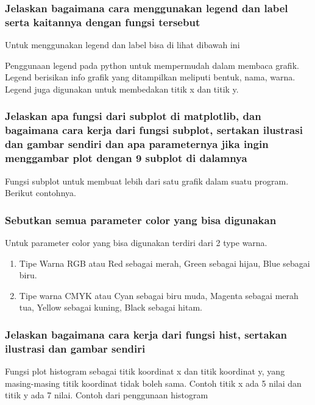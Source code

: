\subsubsection{Jelaskan bagaimana cara menggunakan legend dan label serta kaitannya dengan fungsi tersebut}
\hfill \break
Untuk menggunakan legend dan label bisa di lihat dibawah ini

Penggunaan legend pada python untuk mempermudah dalam membaca grafik. Legend berisikan info grafik yang ditampilkan meliputi bentuk, nama, warna. Legend juga digunakan untuk membedakan titik x dan titik y.

\subsubsection{Jelaskan apa fungsi dari subplot di matplotlib, dan bagaimana cara kerja dari fungsi subplot, sertakan ilustrasi dan gambar sendiri dan apa parameternya jika ingin menggambar plot dengan 9 subplot di dalamnya}
\hfill \break
Fungsi subplot untuk membuat lebih dari satu grafik dalam suatu program.
Berikut contohnya.


\subsubsection{Sebutkan semua parameter color yang bisa digunakan}
\hfill \break
Untuk parameter color yang bisa digunakan terdiri dari 2 type warna.
\begin{enumerate}
    \item Tipe Warna RGB atau Red sebagai merah, Green sebagai hijau, Blue sebagai biru.

    \item Tipe warna CMYK atau Cyan sebagai biru muda, Magenta sebagai merah tua, Yellow sebagai kuning, Black sebagai hitam.
\end{enumerate}

\subsubsection{Jelaskan bagaimana cara kerja dari fungsi hist, sertakan ilustrasi dan gambar sendiri}
\hfill \break
Fungsi plot histogram sebagai titik koordinat x dan titik koordinat y, yang masing-masing titik koordinat tidak boleh sama. Contoh titik x ada 5 nilai dan titik y ada 7 nilai.
Contoh dari penggunaan histogram


